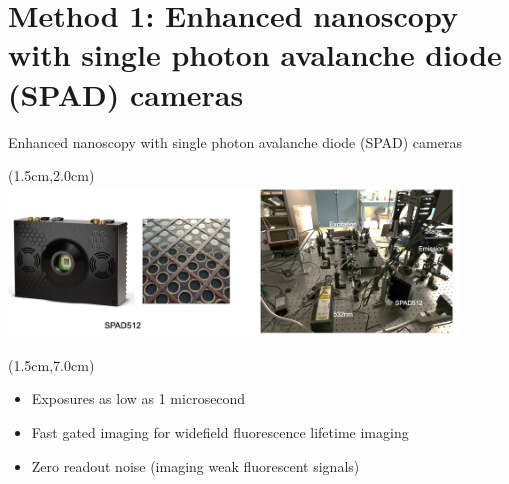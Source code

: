 \documentclass{beamer}					%
\begin{document}

\section{Method 1: Enhanced nanoscopy with single photon avalanche diode (SPAD) cameras}

\begin{frame}{Enhanced nanoscopy with single photon avalanche diode (SPAD) cameras}
\begin{textblock*}{12cm}(1.5cm,2.0cm)
\includegraphics[width=12cm]{media/SPAD.png}
\end{textblock*}
\begin{textblock*}{12cm}(1.5cm,7.0cm)
\begin{itemize}
\item Exposures as low as 1 microsecond
\item Fast gated imaging for widefield fluorescence lifetime imaging
\item Zero readout noise (imaging weak fluorescent signals)
\end{itemize}
\end{textblock*}
\end{frame}
\end{document}
